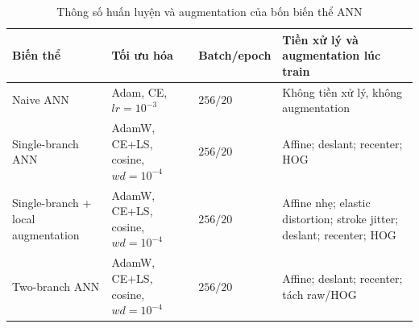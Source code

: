 \begin{table}[H]
\centering
\caption{Thông số huấn luyện và augmentation của bốn biến thể ANN}
\label{tab:mnist-ann-hyperparameters}
\small
\begin{tabularx}{\textwidth}{>{\raggedright\arraybackslash}p{2.8cm} >{\raggedright\arraybackslash}p{2.8cm} >{\raggedright\arraybackslash}p{2.4cm} >{\raggedright\arraybackslash}X}
\toprule
Biến thể & Tối ưu hóa & Batch/epoch & Tiền xử lý và augmentation lúc train \\
\midrule
Naive ANN & Adam, CE, $lr=10^{-3}$ & $256 / 20$ & Không tiền xử lý, không augmentation \\
Single-branch ANN & AdamW, CE+LS, cosine, $wd=10^{-4}$ & $256 / 20$ & Affine; deslant; recenter; HOG \\
Single-branch + local augmentation & AdamW, CE+LS, cosine, $wd=10^{-4}$ & $256 / 20$ & Affine nhẹ; elastic distortion; stroke jitter; deslant; recenter; HOG \\
Two-branch ANN & AdamW, CE+LS, cosine, $wd=10^{-4}$ & $256 / 20$ & Affine; deslant; recenter; tách raw/HOG \\
\bottomrule
\end{tabularx}
\end{table}

